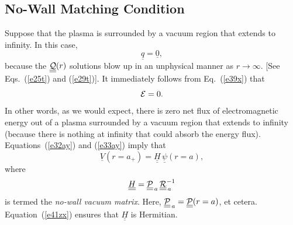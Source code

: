 \documentclass[12pt,prb,aps]{revtex4-1}
\begin{document}
\subsection{No-Wall Matching Condition}
Suppose that the plasma is surrounded by a vacuum region that extends to infinity. In this case, 
\begin{equation}
\underline{q}=\underline{0},
\end{equation}
 because the 
$\underline{\underline{{\cal Q}}}(r)$ solutions blow up in an unphysical manner as $r\rightarrow\infty$. [See Eqs.~(\ref{e25t}) and (\ref{e29t})].
It immediately follows from Eq.~(\ref{e39x}) that
 \begin{equation}\label{ezero}
 {\cal E}=0.
 \end{equation}
  In other words, as we would expect, there is zero net flux of electromagnetic energy out of  a plasma
 surrounded by a vacuum region that extends to infinity (because there is nothing at infinity that could absorb the energy flux). 
Equations~(\ref{e32ay}) and (\ref{e33ay}) imply that
\begin{equation}\label{hdef}
 \underline{V}(r=a_+)= \underline{\underline{H}}\,\underline{\psi}(r=a),
 \end{equation}
 where
 \begin{equation}
 \underline{\underline{H}}= \underline{\underline{\cal P}}_{\,a}\,\underline{\underline{\cal R}}_{\,a}^{-1}
 \end{equation}
 is termed the {\em no-wall vacuum matrix}. 
   Here, $\underline{\underline{\cal P}}_{\,a}= \underline{\underline{\cal P}}(r=a)$, et cetera. 
Equation~(\ref{e41zx}) ensures that  $\underline{\underline{H}}$ is Hermitian. 
\end{document}
